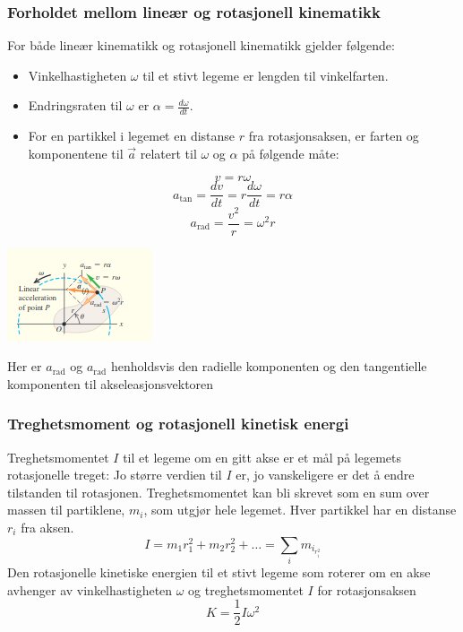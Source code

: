 \subsubsection{Forholdet mellom lineær og rotasjonell kinematikk}
For både lineær kinematikk og rotasjonell kinematikk gjelder følgende:\newline\newline
\begin{itemize}
    \item Vinkelhastigheten $\omega$ til et stivt legeme er lengden til vinkelfarten.
    \item Endringsraten til $\omega$ er $\alpha=\frac{d\omega}{dt}.$
    \item For en partikkel i legemet en distanse $r$ fra rotasjonsaksen, er farten og komponentene til $\vec{a}$ relatert til $\omega$ og $\alpha$ på følgende måte:
\end{itemize}
\begin{equation}
    v=r\omega
\end{equation}
\begin{equation}
    a_{\text{tan}}=\frac{dv}{dt}=r\frac{d\omega}{dt}=r\alpha
\end{equation}
\begin{equation}
    a_{\text{rad}}=\frac{v^2}{r}=\omega^2r
\end{equation}
\begin{center}
\includegraphics{rapport/teori/bilder/tang.png}\newline
\end{center}
Her er $a_\text{rad}$ og $a_\text{rad}$ henholdsvis den radielle komponenten og den tangentielle komponenten til akseleasjonsvektoren \cite{FYSIKK:1}

\subsubsection{Treghetsmoment og rotasjonell kinetisk energi}
Treghetsmomentet $I$ til et legeme om en gitt akse er et mål på legemets rotasjonelle treget: Jo større verdien til $I$ er, jo vanskeligere er det å endre tilstanden til rotasjonen. Treghetsmomentet kan bli skrevet som en sum over massen til partiklene, $m_i$, som utgjør hele legemet. Hver partikkel har en distanse $r_i$ fra aksen.
\begin{equation}
    I=m_1r_1^2+m_2r_2^2+\dots=\sum_i{m_i_r_i^2}
\end{equation}
Den rotasjonelle kinetiske energien til et stivt legeme som roterer om en akse avhenger av vinkelhastigheten $\omega$ og treghetsmomentet $I$ for rotasjonsaksen
\begin{equation}
    K=\frac{1}{2}I\omega^2
\end{equation}
